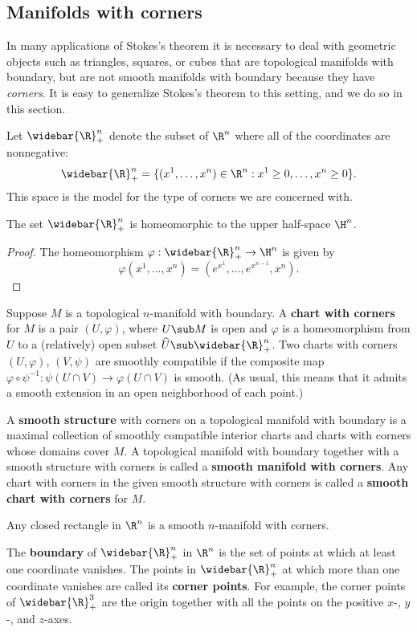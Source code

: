 \subsection{Manifolds with corners}
In many applications of Stokes's theorem it is necessary to deal with geometric objects such as triangles, squares, or cubes that are topological manifolds with boundary, but are not smooth manifolds with boundary because they have \textit{corners}. It is easy to generalize Stokes's theorem to this setting, and we do so in this section.\par
Let $\widebar{\R}^n_+$ denote the subset of $\R^n$ where all of the coordinates are nonnegative:
\[\widebar{\R}^n_+=\{(x^1,\dots,x^n)\in\R^n:x^1\geq 0,\dots,x^n\geq0\}.\]
This space is the model for the type of corners we are concerned with.
\begin{proposition}
The set $\widebar{\R}^n_+$ is homeomorphic to the upper half-space $\H^n$.
\end{proposition}
\begin{proof}
The homeomorphism $\varphi:\widebar{\R}^n_+\to\H^n$ is given by
\[\varphi(x^1,\dots,x^n)=(e^{x^1},\dots,e^{x^{n-1}},x^n).\]
\end{proof}
Suppose $M$ is a topological $n$-manifold with boundary. A \textbf{chart with corners} for $M$ is a pair $(U,\varphi)$, where $U\sub M$ is open and $\varphi$ is a homeomorphism from $U$ to a (relatively) open subset $\widehat{U}\sub\widebar{\R}^n_+$. Two charts with corners $(U,\varphi)$, $(V,\psi)$ are smoothly compatible if the composite map $\varphi\circ\psi^{-1}:\psi(U\cap V)\to \varphi(U\cap V)$ is smooth. (As usual, this means that it admits a smooth extension in an open neighborhood of each point.)\par
A \textbf{smooth structure} with corners on a topological manifold with boundary is a maximal collection of smoothly compatible interior charts and charts with corners
whose domains cover $M$. A topological manifold with boundary together with a smooth structure with corners is called a \textbf{smooth manifold with corners}. Any chart with corners in the given smooth structure with corners is called a \textbf{smooth chart with corners} for $M$.
\begin{example}
Any closed rectangle in $\R^n$ is a smooth $n$-manifold with corners.
\end{example}
The \textbf{boundary} of $\widebar{\R}^n_+$ in $\R^n$ is the set of points at which at least one coordinate vanishes. The points in $\widebar{\R}^n_+$ at which more than one coordinate vanishes are called its \textbf{corner points}. For example, the corner points of $\widebar{\R}^3_+$ are the origin together with all the points on the positive $x$-, $y$-, and $z$-axes.
